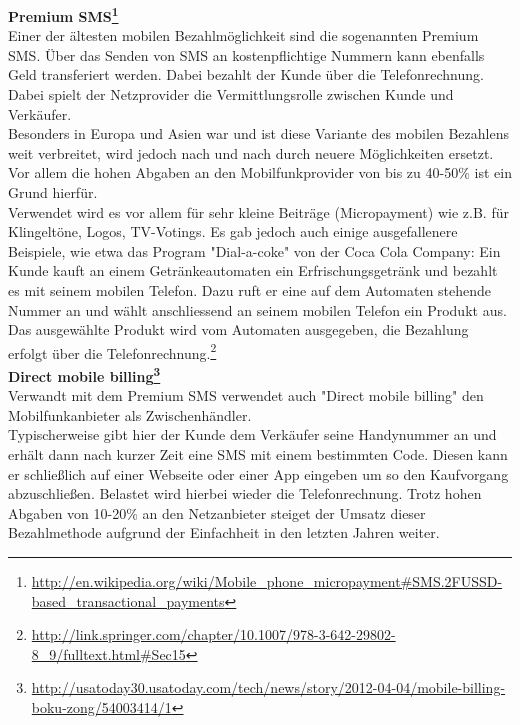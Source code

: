 \textbf{Premium SMS\footnote{\url{http://en.wikipedia.org/wiki/Mobile_phone_micropayment\#SMS.2FUSSD-based_transactional_payments}}}\\
Einer der ältesten mobilen Bezahlmöglichkeit sind die sogenannten Premium SMS. Über das Senden von SMS an kostenpflichtige Nummern kann ebenfalls Geld transferiert werden. Dabei bezahlt der Kunde über die Telefonrechnung. Dabei spielt der Netzprovider die Vermittlungsrolle zwischen Kunde und Verkäufer.\\
Besonders in Europa und Asien war und ist diese Variante des mobilen Bezahlens weit verbreitet, wird jedoch nach und nach durch neuere Möglichkeiten ersetzt. Vor allem die hohen Abgaben an den Mobilfunkprovider von bis zu 40-50\% ist ein Grund hierfür.\\
Verwendet wird es vor allem für sehr kleine Beiträge (Micropayment) wie z.B. für Klingeltöne, Logos, TV-Votings. Es gab jedoch auch einige ausgefallenere Beispiele, wie etwa das Program "Dial-a-coke" von der Coca Cola Company: Ein Kunde kauft an einem Getränkeautomaten ein Erfrischungsgetränk und bezahlt es mit seinem mobilen Telefon. Dazu ruft er eine auf dem Automaten stehende Nummer an und wählt anschliessend an seinem mobilen Telefon ein Produkt aus. Das ausgewählte Produkt wird vom Automaten ausgegeben, die Bezahlung erfolgt über die Telefonrechnung.\footnote{\url{http://link.springer.com/chapter/10.1007/978-3-642-29802-8_9/fulltext.html\#Sec15}}\\
 
\textbf{Direct mobile billing\footnote{\url{http://usatoday30.usatoday.com/tech/news/story/2012-04-04/mobile-billing-boku-zong/54003414/1}}}\\
Verwandt mit dem Premium SMS verwendet auch "Direct mobile billing" den Mobilfunkanbieter als Zwischenhändler.\\
Typischerweise gibt hier der Kunde dem Verkäufer seine Handynummer an und erhält dann nach kurzer Zeit eine SMS mit einem bestimmten Code. Diesen kann er schließlich auf einer Webseite oder einer App eingeben um so den Kaufvorgang abzuschließen. Belastet wird hierbei wieder die Telefonrechnung.
Trotz hohen Abgaben von 10-20\% an den Netzanbieter steiget der Umsatz dieser Bezahlmethode aufgrund der Einfachheit in den letzten Jahren weiter.\\


